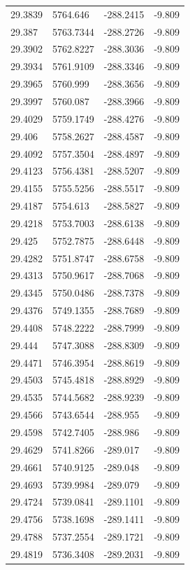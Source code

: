 \begin{table}[H]
\begin{tabular}{llll}
29.3839 & 5764.646 & -288.2415 & -9.809 \\
29.387 & 5763.7344 & -288.2726 & -9.809 \\
29.3902 & 5762.8227 & -288.3036 & -9.809 \\
29.3934 & 5761.9109 & -288.3346 & -9.809 \\
29.3965 & 5760.999 & -288.3656 & -9.809 \\
29.3997 & 5760.087 & -288.3966 & -9.809 \\
29.4029 & 5759.1749 & -288.4276 & -9.809 \\
29.406 & 5758.2627 & -288.4587 & -9.809 \\
29.4092 & 5757.3504 & -288.4897 & -9.809 \\
29.4123 & 5756.4381 & -288.5207 & -9.809 \\
29.4155 & 5755.5256 & -288.5517 & -9.809 \\
29.4187 & 5754.613 & -288.5827 & -9.809 \\
29.4218 & 5753.7003 & -288.6138 & -9.809 \\
29.425 & 5752.7875 & -288.6448 & -9.809 \\
29.4282 & 5751.8747 & -288.6758 & -9.809 \\
29.4313 & 5750.9617 & -288.7068 & -9.809 \\
29.4345 & 5750.0486 & -288.7378 & -9.809 \\
29.4376 & 5749.1355 & -288.7689 & -9.809 \\
29.4408 & 5748.2222 & -288.7999 & -9.809 \\
29.444 & 5747.3088 & -288.8309 & -9.809 \\
29.4471 & 5746.3954 & -288.8619 & -9.809 \\
29.4503 & 5745.4818 & -288.8929 & -9.809 \\
29.4535 & 5744.5682 & -288.9239 & -9.809 \\
29.4566 & 5743.6544 & -288.955 & -9.809 \\
29.4598 & 5742.7405 & -288.986 & -9.809 \\
29.4629 & 5741.8266 & -289.017 & -9.809 \\
29.4661 & 5740.9125 & -289.048 & -9.809 \\
29.4693 & 5739.9984 & -289.079 & -9.809 \\
29.4724 & 5739.0841 & -289.1101 & -9.809 \\
29.4756 & 5738.1698 & -289.1411 & -9.809 \\
29.4788 & 5737.2554 & -289.1721 & -9.809 \\
29.4819 & 5736.3408 & -289.2031 & -9.809 \\

\end{tabular}
\end{table}
